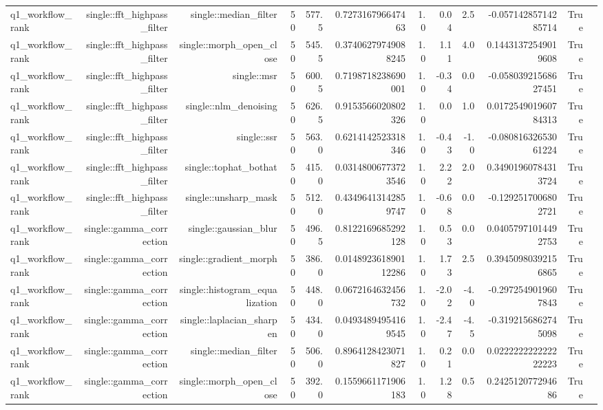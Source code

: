 \begin{tabular}{lrrrrrrrrrrr}
q1\_workflow\_rank & single::fft\_highpass\_filter & single::median\_filter & 50 & 577.5 & 0.727316796647463 & 1.0 & 0.04 & 2.5 & -0.05714285714285714 & True &  \\
q1\_workflow\_rank & single::fft\_highpass\_filter & single::morph\_open\_close & 50 & 545.5 & 0.37406279749088245 & 1.0 & 1.11 & 4.0 & 0.14431372549019608 & True &  \\
q1\_workflow\_rank & single::fft\_highpass\_filter & single::msr & 50 & 600.5 & 0.7198718238690001 & 1.0 & -0.34 & 0.0 & -0.05803921568627451 & True &  \\
q1\_workflow\_rank & single::fft\_highpass\_filter & single::nlm\_denoising & 50 & 626.5 & 0.9153566020802326 & 1.0 & 0.0 & 1.0 & 0.017254901960784313 & True &  \\
q1\_workflow\_rank & single::fft\_highpass\_filter & single::ssr & 50 & 563.0 & 0.6214142523318346 & 1.0 & -0.43 & -1.0 & -0.08081632653061224 & True &  \\
q1\_workflow\_rank & single::fft\_highpass\_filter & single::tophat\_bothat & 50 & 415.0 & 0.03148006773723546 & 1.0 & 2.22 & 2.0 & 0.34901960784313724 & True &  \\
q1\_workflow\_rank & single::fft\_highpass\_filter & single::unsharp\_mask & 50 & 512.0 & 0.43496413142859747 & 1.0 & -0.68 & 0.0 & -0.1292517006802721 & True &  \\
q1\_workflow\_rank & single::gamma\_correction & single::gaussian\_blur & 50 & 496.5 & 0.8122169685292128 & 1.0 & 0.53 & 0.0 & 0.04057971014492753 & True &  \\
q1\_workflow\_rank & single::gamma\_correction & single::gradient\_morph & 50 & 386.0 & 0.014892361890112286 & 1.0 & 1.73 & 2.5 & 0.39450980392156865 & True &  \\
q1\_workflow\_rank & single::gamma\_correction & single::histogram\_equalization & 50 & 448.0 & 0.0672164632456732 & 1.0 & -2.02 & -4.0 & -0.2972549019607843 & True &  \\
q1\_workflow\_rank & single::gamma\_correction & single::laplacian\_sharpen & 50 & 434.0 & 0.04934894954169545 & 1.0 & -2.47 & -4.5 & -0.3192156862745098 & True &  \\
q1\_workflow\_rank & single::gamma\_correction & single::median\_filter & 50 & 506.0 & 0.8964128423071827 & 1.0 & 0.21 & 0.0 & 0.022222222222222223 & True &  \\
q1\_workflow\_rank & single::gamma\_correction & single::morph\_open\_close & 50 & 392.0 & 0.1559661171906183 & 1.0 & 1.28 & 0.5 & 0.242512077294686 & True &  \\

\end{tabular}
